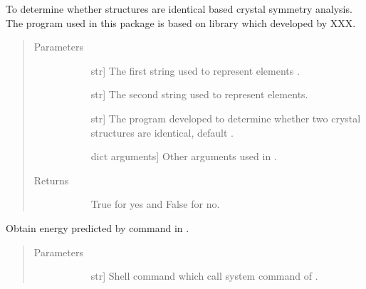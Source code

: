 \documentclass[letterpaper,10pt,english]{sphinxmanual}
\begin{document}
\begin{fulllineitems}
\begin{fulllineitems}
\label{\detokenize{pygace:pygace.ce.CE.compare_crystal}}
To determine whether structures are identical based crystal symmetry
analysis. The program used in this package is based on  library
which developed by XXX.
\begin{quote}\begin{description}
\item[{Parameters}] \leavevmode\begin{description}
\item[{}] \leavevmode{[}str{]}
The first string used to represent elements .

\item[{}] \leavevmode{[}str{]}
The second string used to represent elements.

\item[{}] \leavevmode{[}str{]}
The program developed to determine whether two
crystal structures are identical, default .

\item[{}] \leavevmode{[}dict arguments{]}
Other arguments used in .

\end{description}

\item[{Returns}] \leavevmode\begin{description}
\item[{}] \leavevmode
True for yes and False for no.

\end{description}

\end{description}\end{quote}

\end{fulllineitems}


\begin{fulllineitems}
\label{\detokenize{pygace:pygace.ce.CE.corrdump}}
Obtain energy predicted by  command in .
\begin{quote}\begin{description}
\item[{Parameters}] \leavevmode\begin{description}
\item[{}] \leavevmode{[}str{]}
Shell command which call system  command of .


\end{description}
\end{description}
\end{quote}
\end{fulllineitems}
\end{fulllineitems}
\end{document}
